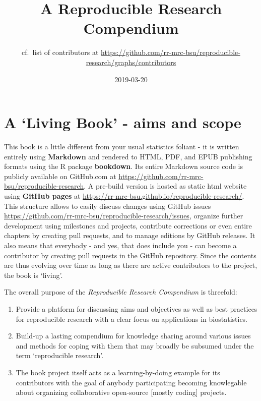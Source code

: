 \documentclass[]{book}
\title{A Reproducible Research Compendium}
\author{cf.~list of contributors at
\url{https://github.com/rr-mrc-bsu/reproducible-research/graphs/contributors}}
\date{2019-03-20}
\providecommand{\tightlist}{%
  \setlength{\itemsep}{0pt}\setlength{\parskip}{0pt}}
\begin{document}
\maketitle

{
\setcounter{tocdepth}{1}
\tableofcontents
}
\chapter{\texorpdfstring{A `Living Book' - aims and
scope}{A Living Book - aims and scope}}\label{a-living-book---aims-and-scope}

This book is a little different from your usual statistics foliant - it
is written entirely using \textbf{Markdown} and rendered to HTML, PDF,
and EPUB publishing formats using the R package \textbf{bookdown}. Its
entire Markdown source code is publicly available on GitHub.com at
\url{https://github.com/rr-mrc-bsu/reproducible-research}. A pre-build
version is hosted as static html website using \textbf{GitHub pages} at
\url{https://rr-mrc-bsu.github.io/reproducible-research/}. This
structure allows to easily discuss changes using GitHub issues
\url{https://github.com/rr-mrc-bsu/reproducible-research/issues},
organize further development using milestones and projects, contribute
corrections or even entire chapters by creating pull requests, and to
manage editions by GitHub releases. It also means that everybody - and
yes, that does include you - can become a contributor by creating pull
requests in the GitHub repository. Since the contents are thus evolving
over time as long as there are active contributors to the project, the
book is `living'.

The overall purpose of the \emph{Reproducible Research Compendium} is
threefold:

\begin{enumerate}
\def\labelenumi{\arabic{enumi}.}
\tightlist
\item
  Provide a platform for discussing aims and objectives as well as best
  practices for reproducible research with a clear focus on applications
  in biostatistics.
\item
  Build-up a lasting compendium for knowledge sharing around various
  issues and methods for coping with them that may broadly be subsumed
  under the term `reproducible research'.
\item
  The book project itself acts as a learning-by-doing example for its
  contributors with the goal of anybody participating becoming
  knowlegable about organizing collaborative open-source {[}mostly
  coding{]} projects.
\end{enumerate}
\end{document}
